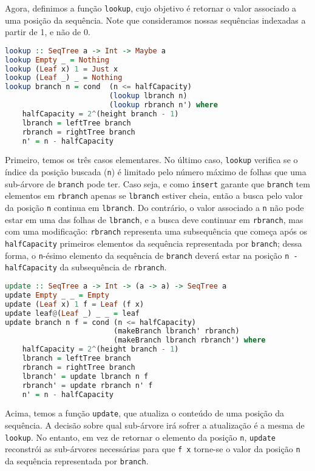 \documentclass[a4paper]{article}
\begin{document}
Agora, definimos a função \texttt{lookup}, cujo objetivo é retornar o valor associado a uma posição da sequência.
Note que consideramos nossas sequências indexadas a partir de 1, e não de 0.

\begin{lstlisting}[language=haskell, frame=single]
lookup :: SeqTree a -> Int -> Maybe a
lookup Empty _ = Nothing
lookup (Leaf x) 1 = Just x
lookup (Leaf _) _ = Nothing
lookup branch n = cond  (n <= halfCapacity)
                        (lookup lbranch n)
                        (lookup rbranch n') where
	halfCapacity = 2^(height branch - 1)
	lbranch = leftTree branch
	rbranch = rightTree branch
	n' = n - halfCapacity
\end{lstlisting}

Primeiro, temos os três casos elementares.
No último caso, \texttt{lookup} verifica se o índice da posição buscada (\texttt{n}) é limitado pelo número máximo de folhas que uma sub-árvore de \texttt{branch} pode ter.
Caso seja, e como \texttt{insert} garante que \texttt{branch} tem elementos em \texttt{rbranch} apenas se \texttt{lbranch} estiver cheia, então a busca pelo valor da posição \texttt{n} continua em \texttt{lbranch}.
Do contrário, o valor associado a \texttt{n} não pode estar em uma das folhas de \texttt{lbranch}, e a busca deve continuar em \texttt{rbranch}, mas com uma modificação: \texttt{rbranch} representa uma subsequência que começa após os \texttt{halfCapacity} primeiros elementos da sequência representada por \texttt{branch}; dessa forma, o \texttt{n}-ésimo elemento da sequência de \texttt{branch} deverá estar na posição \texttt{n - halfCapacity} da subsequência de \texttt{rbranch}.

\begin{lstlisting}[language=haskell, frame=single]
update :: SeqTree a -> Int -> (a -> a) -> SeqTree a
update Empty _ _ = Empty
update (Leaf x) 1 f = Leaf (f x)
update leaf@(Leaf _) _ _ = leaf
update branch n f = cond (n <= halfCapacity)
                         (makeBranch lbranch' rbranch)
                         (makeBranch lbranch rbranch') where
	halfCapacity = 2^(height branch - 1)
	lbranch = leftTree branch
	rbranch = rightTree branch
	lbranch' = update lbranch n f
	rbranch' = update rbranch n' f
	n' = n - halfCapacity
\end{lstlisting}

Acima, temos a função \texttt{update}, que atualiza o conteúdo de uma posição da sequência.
A decisão sobre qual sub-árvore irá sofrer a atualização é a mesma de \texttt{lookup}.
No entanto, em vez de retornar o elemento da posição \texttt{n}, \texttt{update} reconstrói as sub-árvores necessárias para que \texttt{f x} torne-se o valor da posição \texttt{n} da sequência representada por \texttt{branch}.
\end{document}
